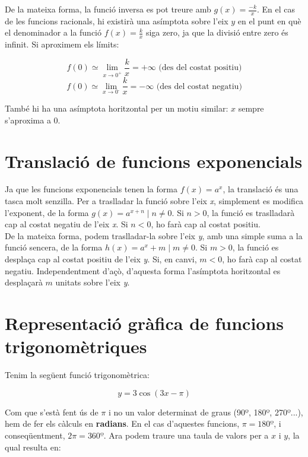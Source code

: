 \documentclass[12pt,a4paper]{article}
\begin{document}
De la mateixa forma, la funció inversa es pot treure amb \(g(x) = \frac{-k}{x}\). En el cas de les funcions racionals, hi existirà una asímptota sobre l'eix \(y\) en el punt en què el denominador a la funció \(f(x) = \frac{k}{x}\) siga zero, ja que la divisió entre zero és infinit. Si aproximem els límits:

\[
	f(0) \simeq \lim\limits_{x \to 0^\text{+}}\frac{k}{x} = +\infty \text{ (des del costat positiu)}
\]
\[
f(0) \simeq \lim\limits_{x \to 0^\text{-}}\frac{k}{x} = -\infty \text{ (des del costat negatiu)}
\]

També hi ha una asímptota horitzontal per un motiu similar: \(x\) sempre s'aproxima a 0.

\section{Translació de funcions exponencials}

Ja que les funcions exponencials tenen la forma \(f(x) = a^x\), la translació és una tasca molt senzilla. Per a traslladar la funció sobre l'eix \textit{x}, simplement es modifica l'exponent, de la forma \(g(x) = a^{x+n} \mid n \neq 0\). Si \(n > 0\), la funció es traslladarà cap al costat negatiu de l'eix \textit{x}. Si \(n < 0\), ho farà cap al costat positiu.\\

De la mateixa forma, podem traslladar-la sobre l'eix \textit{y}, amb una simple suma a la funció sencera, de la forma \(h(x) = a^x+m \mid m \neq 0\). Si \(m > 0\), la funció es desplaça cap al costat positiu de l'eix \textit{y}. Si, en canvi, \(m < 0\), ho farà cap al costat negatiu. Independentment d'açò, d'aquesta forma l'asímptota horitzontal es desplaçarà \(m\) unitats sobre l'eix \textit{y}.

\section{Representació gràfica de funcions trigonomètriques}

Tenim la següent funció trigonomètrica:

\[
	y = 3\cos(3x-\pi)
\]

Com que s'està fent ús de \(\pi\) i no un valor determinat de graus (90º, 180º, 270º...), hem de fer els càlculs en \textbf{radians}. En el cas d'aquestes funcions, \(\pi = 180\text{º}\), i conseqüentment, \(2\pi = 360\text{º}\). Ara podem traure una taula de valors per a \(x \text{ i } y\), la qual resulta en:
\end{document}
